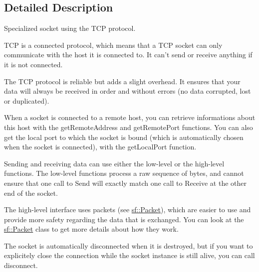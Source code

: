 \subsection{Detailed Description}
Specialized socket using the T\+C\+P protocol. 

T\+C\+P is a connected protocol, which means that a T\+C\+P socket can only communicate with the host it is connected to. It can't send or receive anything if it is not connected.

The T\+C\+P protocol is reliable but adds a slight overhead. It ensures that your data will always be received in order and without errors (no data corrupted, lost or duplicated).

When a socket is connected to a remote host, you can retrieve informations about this host with the get\+Remote\+Address and get\+Remote\+Port functions. You can also get the local port to which the socket is bound (which is automatically chosen when the socket is connected), with the get\+Local\+Port function.

Sending and receiving data can use either the low-\/level or the high-\/level functions. The low-\/level functions process a raw sequence of bytes, and cannot ensure that one call to Send will exactly match one call to Receive at the other end of the socket.

The high-\/level interface uses packets (see \hyperlink{classsf_1_1_packet}{sf\+::\+Packet}), which are easier to use and provide more safety regarding the data that is exchanged. You can look at the \hyperlink{classsf_1_1_packet}{sf\+::\+Packet} class to get more details about how they work.

The socket is automatically disconnected when it is destroyed, but if you want to explicitely close the connection while the socket instance is still alive, you can call disconnect.


